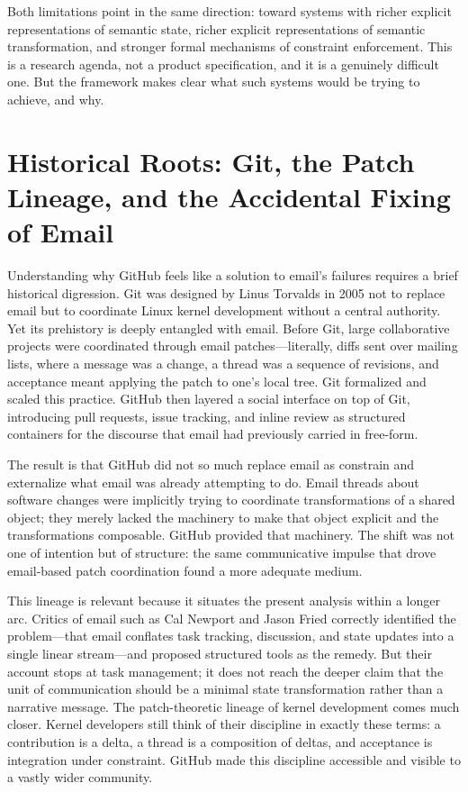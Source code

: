 \documentclass[12pt, letterpaper]{article}
\begin{document}
Both limitations point in the same direction: toward systems with richer explicit representations of semantic state, richer explicit representations of semantic transformation, and stronger formal mechanisms of constraint enforcement. This is a research agenda, not a product specification, and it is a genuinely difficult one. But the framework makes clear what such systems would be trying to achieve, and why.

\section{Historical Roots: Git, the Patch Lineage, and the Accidental Fixing of Email}

Understanding why GitHub feels like a solution to email's failures requires a brief historical digression. Git was designed by Linus Torvalds in 2005 not to replace email but to coordinate Linux kernel development without a central authority. Yet its prehistory is deeply entangled with email. Before Git, large collaborative projects were coordinated through email patches---literally, diffs sent over mailing lists, where a message was a change, a thread was a sequence of revisions, and acceptance meant applying the patch to one's local tree. Git formalized and scaled this practice. GitHub then layered a social interface on top of Git, introducing pull requests, issue tracking, and inline review as structured containers for the discourse that email had previously carried in free-form.

The result is that GitHub did not so much replace email as constrain and externalize what email was already attempting to do. Email threads about software changes were implicitly trying to coordinate transformations of a shared object; they merely lacked the machinery to make that object explicit and the transformations composable. GitHub provided that machinery. The shift was not one of intention but of structure: the same communicative impulse that drove email-based patch coordination found a more adequate medium.

This lineage is relevant because it situates the present analysis within a longer arc. Critics of email such as Cal Newport and Jason Fried correctly identified the problem---that email conflates task tracking, discussion, and state updates into a single linear stream---and proposed structured tools as the remedy. But their account stops at task management; it does not reach the deeper claim that the unit of communication should be a minimal state transformation rather than a narrative message. The patch-theoretic lineage of kernel development comes much closer. Kernel developers still think of their discipline in exactly these terms: a contribution is a delta, a thread is a composition of deltas, and acceptance is integration under constraint. GitHub made this discipline accessible and visible to a vastly wider community.
\end{document}
